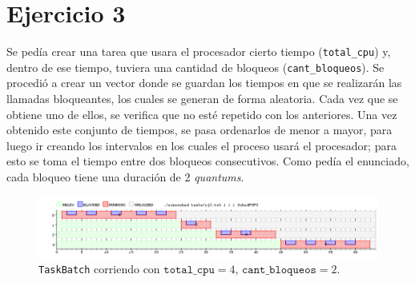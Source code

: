 \section{Ejercicio 3}
	Se pedía crear una tarea que usara el procesador cierto tiempo
	(\texttt{total\_cpu}) y, dentro de ese tiempo, tuviera una cantidad de
	bloqueos (\texttt{cant\_bloqueos}). Se procedió a crear un vector donde se
	guardan los tiempos en que se realizarán las llamadas bloqueantes, los
	cuales se generan de forma aleatoria. Cada vez que se obtiene uno de ellos,
	se verifica que no esté repetido con los anteriores. Una vez obtenido este
	conjunto de tiempos, se pasa ordenarlos de menor a mayor, para luego ir
	creando los intervalos en los cuales el proceso usará el procesador; para
	esto se toma el tiempo entre dos bloqueos consecutivos. Como pedía el
	enunciado, cada bloqueo tiene una duración de 2 \emph{quantums}.

	\begin{figure}[ht]
		\begin{center}
			\includegraphics[width=1\columnwidth]{imagenes/ej3.png}
			\caption{\texttt{TaskBatch} corriendo con $\texttt{total\_cpu} = 4$,
			$\texttt{cant\_bloqueos} = 2$.}
		\end{center}
	\end{figure}

